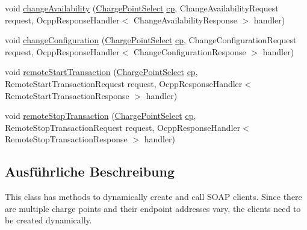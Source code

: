\begin{DoxyCompactItemize}
\item 
void \hyperlink{classde_1_1rwth_1_1idsg_1_1steve_1_1ocpp_1_1soap_1_1_charge_point_service12___soap_invoker_a8145a6c5ab9bc6251eab8bfc10461b81}{change\-Availability} (\hyperlink{classde_1_1rwth_1_1idsg_1_1steve_1_1repository_1_1dto_1_1_charge_point_select}{Charge\-Point\-Select} \hyperlink{get_transaction_ids_8js_a02fb69feb56940fd46d72ea6a60e511f}{cp}, Change\-Availability\-Request request, Ocpp\-Response\-Handler$<$ Change\-Availability\-Response $>$ handler)
\item 
void \hyperlink{classde_1_1rwth_1_1idsg_1_1steve_1_1ocpp_1_1soap_1_1_charge_point_service12___soap_invoker_a9d9f46a544b0cd8df77beb84bd9d0e21}{change\-Configuration} (\hyperlink{classde_1_1rwth_1_1idsg_1_1steve_1_1repository_1_1dto_1_1_charge_point_select}{Charge\-Point\-Select} \hyperlink{get_transaction_ids_8js_a02fb69feb56940fd46d72ea6a60e511f}{cp}, Change\-Configuration\-Request request, Ocpp\-Response\-Handler$<$ Change\-Configuration\-Response $>$ handler)
\item 
void \hyperlink{classde_1_1rwth_1_1idsg_1_1steve_1_1ocpp_1_1soap_1_1_charge_point_service12___soap_invoker_a5948354388168041eeff68539a6c7c35}{remote\-Start\-Transaction} (\hyperlink{classde_1_1rwth_1_1idsg_1_1steve_1_1repository_1_1dto_1_1_charge_point_select}{Charge\-Point\-Select} \hyperlink{get_transaction_ids_8js_a02fb69feb56940fd46d72ea6a60e511f}{cp}, Remote\-Start\-Transaction\-Request request, Ocpp\-Response\-Handler$<$ Remote\-Start\-Transaction\-Response $>$ handler)
\item 
void \hyperlink{classde_1_1rwth_1_1idsg_1_1steve_1_1ocpp_1_1soap_1_1_charge_point_service12___soap_invoker_acfbbc89fbeecc79fff1514768bac886e}{remote\-Stop\-Transaction} (\hyperlink{classde_1_1rwth_1_1idsg_1_1steve_1_1repository_1_1dto_1_1_charge_point_select}{Charge\-Point\-Select} \hyperlink{get_transaction_ids_8js_a02fb69feb56940fd46d72ea6a60e511f}{cp}, Remote\-Stop\-Transaction\-Request request, Ocpp\-Response\-Handler$<$ Remote\-Stop\-Transaction\-Response $>$ handler)
\end{DoxyCompactItemize}


\subsection{Ausführliche Beschreibung}
This class has methods to dynamically create and call S\-O\-A\-P clients. Since there are multiple charge points and their endpoint addresses vary, the clients need to be created dynamically.

